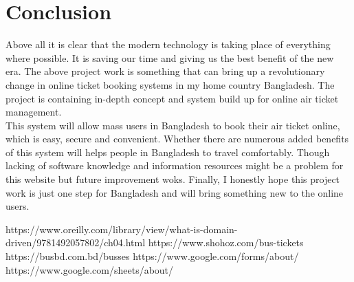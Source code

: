 \documentclass[runningheads]{llncs}
\begin{document}
\chapter*{Conclusion}
Above all it is clear that the modern technology is taking place of everything where possible. It is saving our time and giving us the best benefit of the new era. The above project work is something that can bring up a revolutionary change in online ticket booking systems in my home country Bangladesh. The project is containing in-depth concept and system build up for online air ticket management. \\This system will allow mass users in Bangladesh to book their air ticket online, which is easy, secure and convenient. Whether there are numerous added benefits of this system will helps people in Bangladesh to travel comfortably. Though lacking of software knowledge and information resources might be a problem for this website but future improvement woks. Finally, I honestly hope this project work is just one step for Bangladesh and will bring something new to the online users.
\vspace{1 in}
\begin{thebibliography}{99}
 https://www.oreilly.com/library/view/what-is-domain-driven/9781492057802/ch04.html
 https://www.shohoz.com/bus-tickets
 https://busbd.com.bd/busses
 https://www.google.com/forms/about/
 https://www.google.com/sheets/about/

\end{thebibliography}
\end{document}
